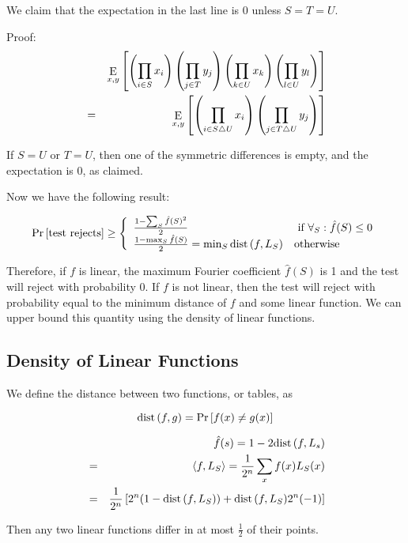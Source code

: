 \documentclass[12pt]{article}
\begin{document}
We claim that the expectation in the last line is 0 unless $S=T=U$.

Proof:
\begin{eqnarray*}
& & \displaystyle \mathop{\rm {E}}_{x,y}\left[\left(\prod_{i \in S}x_i\right)
               \left(\prod_{j \in T}y_j\right)
               \left(\prod_{k \in U}x_k\right)
               \left(\prod_{l \in U}y_l\right)\right] \\
& = & \mathop{\rm {E}}_{x,y}\left[\left(\prod_{i \in S \triangle U}{x_i}\right)
               \left(\prod_{j \in T \triangle U}{y_j}\right)\right]
\end{eqnarray*}

If $S=U$ or $T=U$, then one of the symmetric differences is empty, and the
expectation is 0, as claimed.

Now we have the following result:

\begin{displaymath}
\Pr{\left[ \textrm{test rejects} \right]} \ge \left\{ \begin{array}{ll}
\frac{1 - \sum_S{\hat{f}(S)^2}}{2} &
\textrm{ if } \forall_{S}: \hat{f}(S) \le 0\\
\frac{1 - \max_S{\hat{f}(S)}}{2} = \min_S{{\rm dist}\,(f,L_S)} & \textrm{otherwise}
\end{array} \right.
\end{displaymath}

Therefore, if $f$ is linear, the maximum Fourier coefficient $\hat{f}(S)$ is
1 and the test will reject with probability 0. If $f$ is not linear,
then the test will reject with probability equal to the minimum distance of
$f$ and some linear function. We can upper bound this quantity using the
density of linear functions.

\subsection{Density of Linear Functions}

\begin{lemma}

We define the distance between two functions, or tables, as

\begin{displaymath}
{\rm dist}\,(f,g) = \Pr\left[f(x) \ne g(x)\right]
\end{displaymath}

\begin{eqnarray*}
& & \displaystyle \hat{f}(s) = 1 - 2{\rm dist}\,(f,L_s)\\
& = & \langle f, L_S \rangle = \frac{1}{2^n}\sum_x{f(x)L_S(x)}\\
& = & \frac{1}{2^n} \left[ 2^n(1 - {\rm dist}\,(f,L_S)) + {\rm dist}\,(f,L_S)2^n(-1) \right]
\end{eqnarray*}

Then any two linear functions differ in at most $\frac{1}{2}$ of their points.
\end{lemma}
\end{document}
